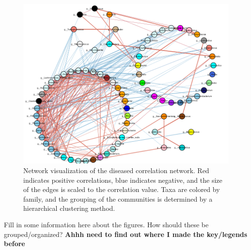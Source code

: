 \begin{figure}[!thbp]
    \centering
    \includegraphics[width=1.0\linewidth]{figure/results/diseased_net.png}
    \caption[Network visualization of the diseased correlation network.]{Network visualization of the diseased correlation network. Red indicates positive correlations, blue indicates negative, and the size of the edges is scaled to the correlation value. Taxa are colored by family, and the grouping of the communities is determined by a hierarchical clustering method.}
    \label{fig:diseased-net}
\end{figure}


Fill in some information here about the figures. How should these be grouped/organized?
\textbf{Ahhh need to find out where I made the key/legends before}